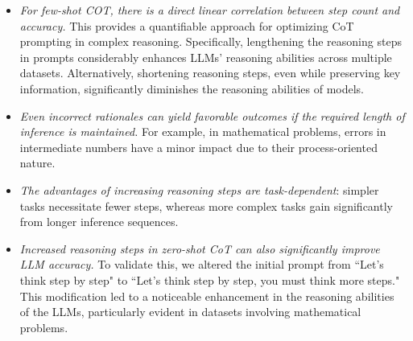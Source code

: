\begin{itemize}[leftmargin=*]\setlength\itemsep{-0.3em}

\item \emph{For few-shot COT, there is a direct linear correlation between step count and accuracy.} This provides a quantifiable approach for optimizing CoT prompting in complex reasoning. Specifically, lengthening the reasoning steps in prompts considerably enhances LLMs' reasoning abilities across multiple datasets. Alternatively, shortening reasoning steps, even while preserving key information, significantly diminishes the reasoning abilities of models.
%
\item \emph{Even incorrect rationales can yield favorable outcomes if the required length of inference is maintained.} For example, in mathematical problems, errors in intermediate numbers have a minor impact due to their process-oriented nature.

\item \emph{The advantages of increasing reasoning steps are task-dependent}: simpler tasks necessitate fewer steps, whereas more complex tasks gain significantly from longer inference sequences.

\item \emph{Increased reasoning steps in zero-shot CoT can also significantly improve LLM accuracy.} To validate this, we altered the initial prompt from ``Let's think step by step" to ``Let's think step by step, you must think more steps." This modification led to a noticeable enhancement in the reasoning abilities of the LLMs, particularly evident in datasets involving mathematical problems.

\end{itemize}